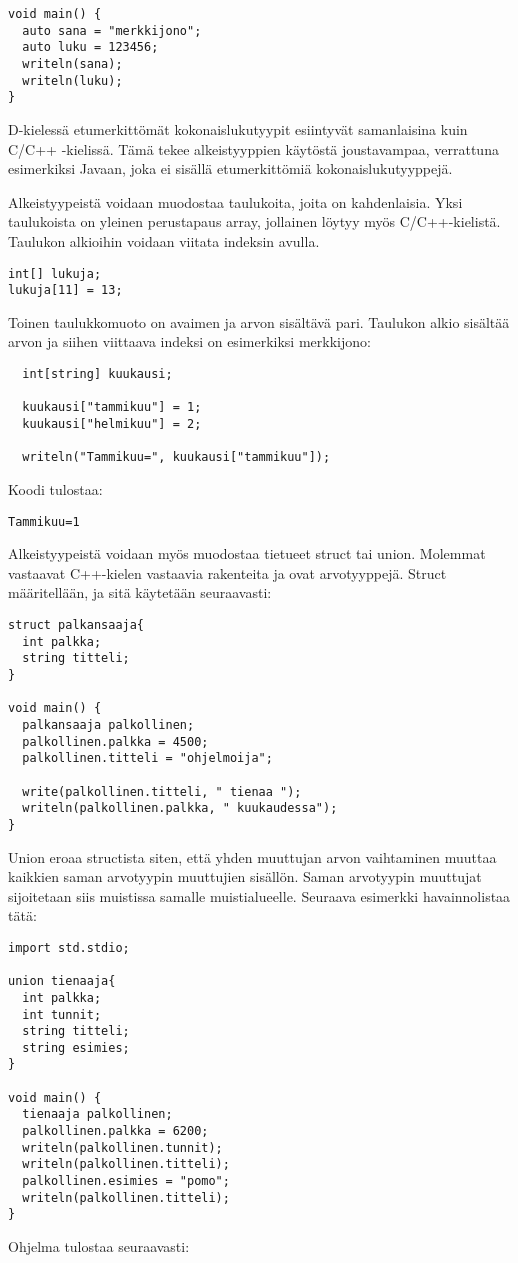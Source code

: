 \documentclass[11pt,oneside,a4paper]{article}
\begin{document}
\begin{verbatim}
void main() {
  auto sana = "merkkijono";
  auto luku = 123456;
  writeln(sana);
  writeln(luku);
}
\end{verbatim}

D-kielessä etumerkittömät kokonaislukutyypit esiintyvät samanlaisina kuin C/C++ -kielissä. Tämä tekee alkeistyyppien käytöstä joustavampaa, verrattuna esimerkiksi Javaan, joka ei sisällä etumerkittömiä kokonaislukutyyppejä.

Alkeistyypeistä voidaan muodostaa taulukoita, joita on kahdenlaisia. Yksi taulukoista on yleinen perustapaus array, jollainen löytyy myös C/C++-kielistä. Taulukon alkioihin voidaan viitata indeksin avulla.
\begin{verbatim}
int[] lukuja;
lukuja[11] = 13;
\end{verbatim}

Toinen taulukkomuoto on avaimen ja arvon sisältävä pari. Taulukon alkio sisältää arvon ja siihen viittaava indeksi on esimerkiksi merkkijono: 
\begin{verbatim}
  int[string] kuukausi;
  
  kuukausi["tammikuu"] = 1;
  kuukausi["helmikuu"] = 2;
  
  writeln("Tammikuu=", kuukausi["tammikuu"]);
\end{verbatim}
Koodi tulostaa:
\begin{verbatim}
Tammikuu=1
\end{verbatim}

Alkeistyypeistä voidaan myös muodostaa tietueet struct tai union. Molemmat vastaavat C++-kielen vastaavia rakenteita ja ovat arvotyyppejä. Struct määritellään, ja sitä käytetään seuraavasti:

\begin{verbatim}
struct palkansaaja{
  int palkka;
  string titteli;
}

void main() {
  palkansaaja palkollinen;
  palkollinen.palkka = 4500;
  palkollinen.titteli = "ohjelmoija";

  write(palkollinen.titteli, " tienaa ");
  writeln(palkollinen.palkka, " kuukaudessa");
}
\end{verbatim}

Union eroaa structista siten, että yhden muuttujan arvon vaihtaminen muuttaa kaikkien saman arvotyypin muuttujien sisällön. Saman arvotyypin muuttujat sijoitetaan siis muistissa samalle muistialueelle. Seuraava esimerkki havainnolistaa tätä:
\begin{verbatim}
import std.stdio;

union tienaaja{
  int palkka;
  int tunnit;
  string titteli;
  string esimies;
}

void main() {
  tienaaja palkollinen;
  palkollinen.palkka = 6200;
  writeln(palkollinen.tunnit);
  writeln(palkollinen.titteli);
  palkollinen.esimies = "pomo";
  writeln(palkollinen.titteli);
}
\end{verbatim}
Ohjelma tulostaa seuraavasti:
\end{document}
